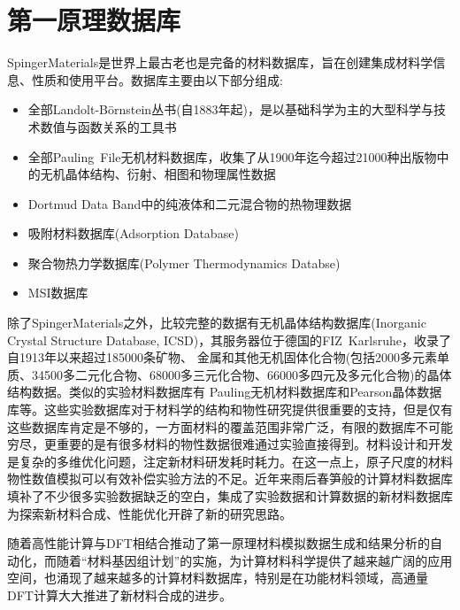 \section{第一原理数据库}
\textrm{SpingerMaterials}\cite{SpringerM_URL}是世界上最古老也是完备的材料数据库，旨在创建集成材料学信息、性质和使用平台。数据库主要由以下部分组成:
\begin{itemize}
	\item 全部\textrm{Landolt-B{\"o}rnstein}丛书(自1883年起)，是以基础科学为主的大型科学与技术数值与函数关系的工具书
	\item 全部\textrm{Pauling~File}无机材料数据库，收集了从1900年迄今超过21000种出版物中的无机晶体结构、衍射、相图和物理属性数据
	\item \textrm{Dortmud Data Band}中的纯液体和二元混合物的热物理数据
	\item 吸附材料数据库(\textrm{Adsorption Database})
	\item 聚合物热力学数据库(\textrm{Polymer Thermodynamics Databse})
	\item \textrm{MSI}数据库
\end{itemize}

除了\textrm{SpingerMaterials}之外，比较完整的数据有无机晶体结构数据库\textrm{(Inorganic Crystal Structure Database, ICSD)}\cite{ICSD_URL}，其服务器位于德国的\textrm{FIZ~Karlsruhe}，收录了自1913年以来超过185000条矿物、 金属和其他无机固体化合物(包括2000多元素单质、34500多二元化合物、68000多三元化合物、66000多四元及多元化合物)的晶体结构数据。类似的实验材料数据库有%
\textrm{Pauling}无机材料数据库\cite{Pauling_URL}和\textrm{Pearson}晶体数据库\cite{Pearson_URL}等。这些实验数据库对于材料学的结构和物性研究提供很重要的支持，但是仅有这些数据库肯定是不够的，一方面材料的覆盖范围非常广泛，有限的数据库不可能穷尽，更重要的是有很多材料的物性数据很难通过实验直接得到。材料设计和开发是复杂的多维优化问题，注定新材料研发耗时耗力。在这一点上，原子尺度的材料物性数值模拟可以有效补偿实验方法的不足。近年来雨后春笋般的计算材料数据库填补了不少很多实验数据缺乏的空白\cite{CMS58-227_2012}，集成了实验数据和计算数据的新材料数据库为探索新材料合成、性能优化开辟了新的研究思路。

随着高性能计算与\textrm{DFT}相结合推动了第一原理材料模拟数据生成和结果分析的自动化，而随着“材料基因组计划”的实施，为计算材料科学提供了越来越广阔的应用空间，也涌现了越来越多的计算材料数据库，特别是在功能材料领域，高通量\textrm{DFT}计算大大推进了新材料合成的进步。\cite{JCED59-3232_2014, IC53-11849_2014,JPCL4-3607_2013,PCCP16-22073_2014}

